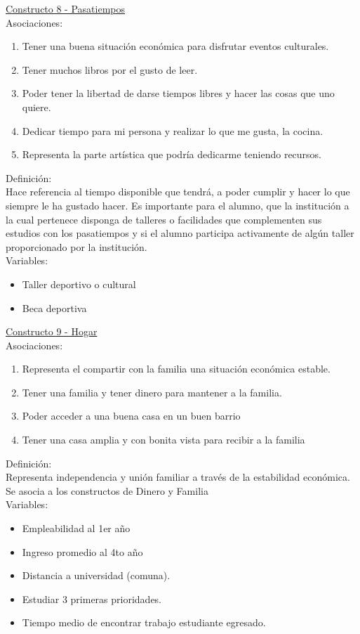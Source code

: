 \underline {Constructo 8 - Pasatiempos} \\
Asociaciones:
\begin{enumerate}
	\item Tener una buena situación económica para disfrutar eventos culturales.
	\item Tener muchos libros por el gusto de leer.
	\item Poder tener la libertad de darse tiempos libres y hacer las cosas que uno quiere.
	\item Dedicar tiempo para mi persona y realizar lo que me gusta, la cocina.	
	\item Representa la parte artística que podría dedicarme teniendo recursos.
\end{enumerate}

Definición:\\
Hace referencia al tiempo disponible que tendrá, a poder cumplir y hacer lo que siempre le ha gustado hacer. Es importante para el alumno, que la institución a la cual pertenece disponga de talleres o facilidades que complementen sus estudios con los pasatiempos y si el alumno participa activamente de algún taller proporcionado por la institución.\\


Variables:
\begin{itemize}
	\item Taller deportivo o cultural 
	\item Beca deportiva
\end{itemize}


\underline {Constructo 9 - Hogar} \\
Asociaciones:
\begin{enumerate}
	\item Representa el compartir con la familia una situación económica estable.
	\item Tener una familia y tener dinero para mantener a la familia.
	\item Poder acceder a una buena casa en un buen barrio
	\item Tener una casa amplia y con bonita vista para recibir a la familia	
\end{enumerate}

Definición:\\
Representa independencia y unión familiar a través de la estabilidad económica. Se asocia a los constructos de Dinero y Familia\\

Variables:
\begin{itemize}
	\item Empleabilidad al 1er año
	\item Ingreso promedio al 4to año
	\item Distancia a universidad (comuna).
	\item Estudiar 3 primeras prioridades.
	\item Tiempo medio de encontrar trabajo estudiante egresado.	
\end{itemize} 

